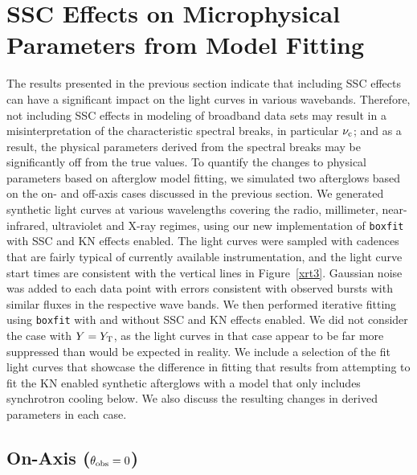 \documentclass[fleqn,usenatbib]{mnras}
\begin{document}
\section{SSC Effects on Microphysical Parameters from Model Fitting}\label{mod}

The results presented in the previous section indicate that including SSC effects can have a significant impact on the light curves in various wavebands. Therefore, not including SSC effects in modeling of broadband data sets may result in a misinterpretation of the characteristic spectral breaks, in particular $\nu_{\rm c}$; and as a result, the physical parameters derived from the spectral breaks may be significantly off from the true values. To quantify the changes to physical parameters based on afterglow model fitting, we simulated two afterglows based on the on- and off-axis cases discussed in the previous section. We generated synthetic light curves at various wavelengths covering the radio, millimeter, near-infrared, ultraviolet and X-ray regimes, using our new implementation of \texttt{boxfit} with SSC and KN effects enabled. The light curves were sampled with cadences that are fairly typical of currently available instrumentation, and the light curve start times are consistent with the vertical lines in Figure~\ref{xrt3}. Gaussian noise was added to each data point with errors consistent with observed bursts with similar fluxes in the respective wave bands. We then performed iterative fitting using \texttt{boxfit} with and without SSC and KN effects enabled. We did not consider the case with $Y=Y_{\rm T}$, as the light curves in that case appear to be far more suppressed than would be expected in reality. We include a selection of the fit light curves that showcase the difference in fitting that results from attempting to fit the KN enabled synthetic afterglows with a model that only includes synchrotron cooling below. We also discuss the resulting changes in derived parameters in each case.


\subsection{On-Axis ($\theta_{\rm obs}=0$)}
\end{document}
